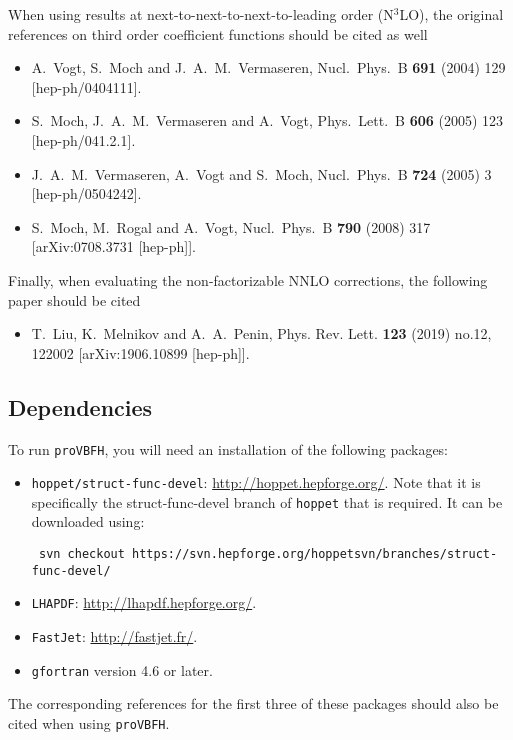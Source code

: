 \documentclass[12pt,a4]{article}
\newcommand{\provbfh}{\texttt{proVBFH}\xspace}
\newcommand{\hoppet}{\texttt{hoppet}\xspace}
\begin{document}
When using results at next-to-next-to-next-to-leading order (N$^3$LO), the
original references on third order coefficient functions should be
cited as well
\begin{itemize}
\item A.~Vogt, S.~Moch and J.~A.~M.~Vermaseren,
  Nucl.\ Phys.\ B {\bf 691} (2004) 129
  [hep-ph/0404111].
\item S.~Moch, J.~A.~M.~Vermaseren and A.~Vogt,
  Phys.\ Lett.\ B {\bf 606} (2005) 123
  [hep-ph/041.2.1].
\item J.~A.~M.~Vermaseren, A.~Vogt and S.~Moch,
  Nucl.\ Phys.\ B {\bf 724} (2005) 3
  [hep-ph/0504242].
\item S.~Moch, M.~Rogal and A.~Vogt,
  Nucl.\ Phys.\ B {\bf 790} (2008) 317
  [arXiv:0708.3731 [hep-ph]].
\end{itemize}

Finally, when evaluating the non-factorizable NNLO corrections, the following
paper should be cited
\begin{itemize}
\item T.~Liu, K.~Melnikov and A.~A.~Penin,
  Phys. Rev. Lett. \textbf{123} (2019) no.12, 122002
  [arXiv:1906.10899 [hep-ph]].
\end{itemize}
\subsection{Dependencies}
To run \provbfh, you will need an installation of the following packages:
\begin{itemize}
\item \texttt{hoppet/struct-func-devel}:
  \url{http://hoppet.hepforge.org/}.  Note that it is specifically the
  struct-func-devel branch of \hoppet that is required.  It can be
  downloaded using:
\begin{verbatim}
 svn checkout https://svn.hepforge.org/hoppetsvn/branches/struct-func-devel/
\end{verbatim}
\item \texttt{LHAPDF}: \url{http://lhapdf.hepforge.org/}.
\item \texttt{FastJet}: \url{http://fastjet.fr/}.
\item \texttt{gfortran} version 4.6 or later.
\end{itemize}
%
The corresponding references for the first three of these packages
should also be cited when using \provbfh.
\end{document}
